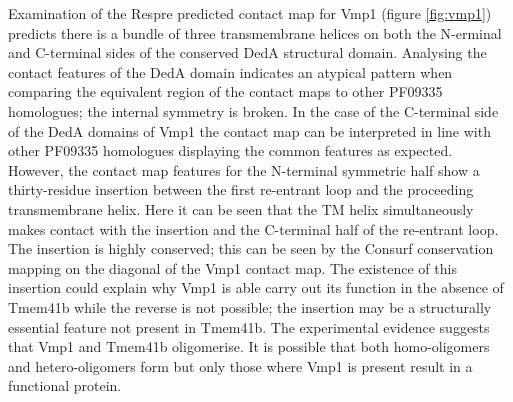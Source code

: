 Examination of the Respre predicted contact map for Vmp1 (figure \ref{fig:vmp1}) predicts there is a bundle of three transmembrane helices on both the N-erminal and C-terminal sides of the conserved DedA structural domain.  Analysing the contact features of the DedA domain indicates an atypical pattern when comparing the equivalent region of the contact maps to other PF09335 homologues; the internal symmetry is broken. In the case of the C-terminal side of the DedA domains of Vmp1 the contact map can be interpreted in line with other PF09335 homologues displaying the common features as expected. However, the contact map features for the N-terminal symmetric half show a thirty-residue insertion between the first re-entrant loop and the proceeding transmembrane helix.  Here it can be seen that the TM helix simultaneously makes contact with the insertion and the C-terminal half of the re-entrant loop.  The insertion is highly conserved; this can be seen by the Consurf conservation mapping on the diagonal of the Vmp1 contact map.  The existence of this insertion could explain why Vmp1 is able carry out its function in the absence of Tmem41b while the reverse is not possible; the insertion may be a structurally essential feature not present in Tmem41b. The experimental evidence suggests that Vmp1 and Tmem41b oligomerise. It is possible that both homo-oligomers and hetero-oligomers form but only those where Vmp1 is present result in a functional protein.  


